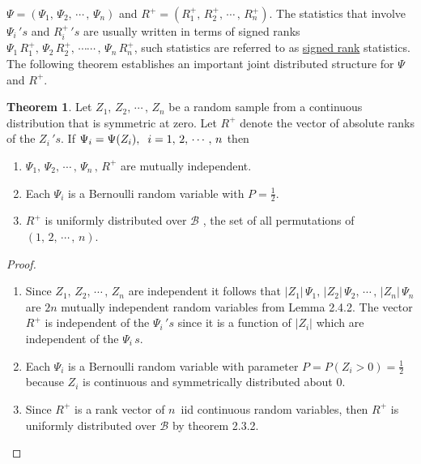 \documentclass[12pt,a4paper]{report}
\theoremstyle{definition}
\newtheorem{thm}{Theorem}[section]
\theoremstyle{plain}
\begin{document}
$\Psi = \left(\Psi_1, \, \Psi_2, \, \cdots\, , \, \Psi_n\right)$ and $R^+ = \left(R^+_1, \, R^+_2, \, \cdots\,, \, R_n^+\right)$. The statistics that involve $\Psi_i\, 's$  and $R^+_i\, 's$ are usually written in terms of signed ranks $\Psi_1\, R^+_1, \, \Psi_2\,R^+_2, \, \cdots\cdots\, , \, \Psi_n\, R^+_n$, such statistics are referred to as \underline{signed rank} statistics.\\

The following theorem establishes an important joint distributed structure for $\Psi$ and $R^+$.


\begin{thm}
Let $Z_1, \, Z_2, \, \cdots\, , \, Z_n$ be a random sample from a continuous distribution that is symmetric at zero. Let $R^+$ denote the vector of absolute ranks of the $Z_i\, 's$. If $\Psi_i = \Psi(Z_i), \hspace{0.2cm} i = 1, \, 2, \, \cdots \, , \, n$ then 
\begin{enumerate}
\item[(a)] $\Psi_1, \, \Psi_2, \, \cdots\, , \, \Psi_n\, , \, R^+$ are mutually independent.
\item[(b)] Each $\Psi_i$ is a Bernoulli random variable with $P = \frac{1}{2}$.
\item[(c)] $R^+$ is uniformly distributed over $\mathcal{B}$ , the set of all permutations of $(1, \, 2, \, \cdots\, , \, n)$.
\end{enumerate}
\end{thm}


\begin{proof}
\begin{enumerate}
\item[(a)] Since $Z_1, \, Z_2, \, \cdots\, , \, Z_n$ are independent it follows that $|Z_1|\, \Psi_1, \, |Z_2|\,\Psi_2, \, \cdots\, , \, |Z_n|\,\Psi_n$ are $2n$ mutually independent random variables from Lemma 2.4.2. The vector $R^+$ is independent of the $\Psi_i\, 's$ since it is a function of $|Z_i|$ which are independent of the $\Psi_i\, s$.
\item[(b)] Each $\Psi_i$ is a Bernoulli random variable with parameter $P = P(Z_i > 0) = \frac{1}{2}$ because $Z_i$ is continuous and symmetrically distributed about 0.
\item[(c)] Since $R^+$ is a rank vector of $n\,$ iid continuous random variables, then $R^+$ is uniformly distributed over $\mathcal{B}$ by theorem 2.3.2.
\end{enumerate}
\end{proof}
\end{document}
